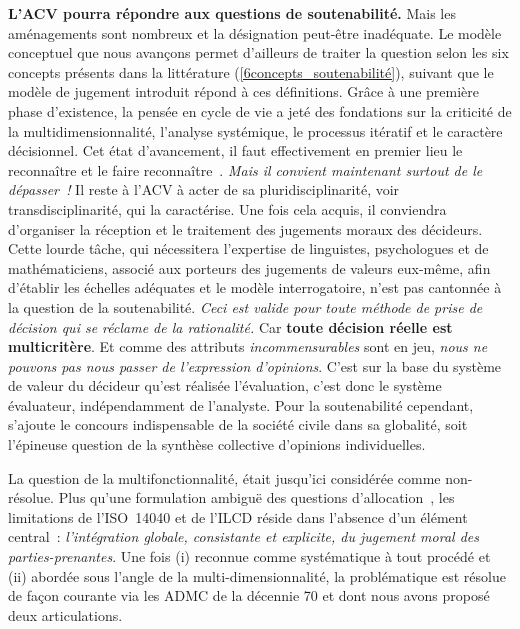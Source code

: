 \textbf{L'ACV pourra répondre aux questions de soutenabilité.}
Mais les aménagements sont nombreux et la désignation peut-être inadéquate.
Le modèle conceptuel que nous avançons permet d'ailleurs de traiter la question selon les six concepts présents dans la littérature (\ref{6concepts_soutenabilité}), suivant que le modèle de jugement introduit répond à ces définitions.
Grâce à une première phase d'existence, la pensée en cycle de vie a jeté des fondations sur la criticité de la multidimensionnalité, l'analyse systémique, le processus itératif et le caractère décisionnel.
Cet état d'avancement, il faut effectivement en premier lieu le reconnaître et le faire reconnaître~\cite[conclusion p.244]{klopffer_background_2014}.
\textit{Mais il convient maintenant surtout de le dépasser~!}
Il reste à l'ACV à acter de sa pluridisciplinarité, voir transdisciplinarité, qui la caractérise.
Une fois cela acquis, il conviendra d'organiser la réception et le traitement des jugements moraux des décideurs.
Cette lourde tâche, qui nécessitera l'expertise de linguistes, psychologues et de mathématiciens, associé aux porteurs des jugements de valeurs eux-même, afin d'établir les échelles adéquates et le modèle interrogatoire, n'est pas cantonnée à la question de la soutenabilité.
\emph{Ceci est valide pour toute méthode de prise de décision qui se réclame de la rationalité.}
Car \textbf{toute décision réelle est multicritère}.
Et comme des attributs \emph{incommensurables} sont en jeu, \emph{nous ne pouvons pas nous passer de l'expression d'opinions}.
C'est sur la base du système de valeur du décideur qu'est réalisée l'évaluation, c'est donc le système évaluateur, indépendamment de l'analyste.
Pour la soutenabilité cependant, s'ajoute le concours indispensable de la société civile dans sa globalité, soit l'épineuse question de la synthèse collective d'opinions individuelles.

La question de la multifonctionnalité, était jusqu'ici considérée comme non-résolue.
Plus qu'une formulation ambiguë des questions d'allocation~\cite{weidema_has_2014},
les limitations de l'ISO~14040 et de l'ILCD réside dans l'absence d'un élément central~: \emph{l'intégration globale, consistante et explicite, du jugement moral des parties-prenantes}.
Une fois (i) reconnue comme systématique à tout procédé et (ii) abordée sous l'angle de la multi-dimensionnalité, la problématique est résolue de façon courante via les \gls{ADMC} de la décennie 70 et dont nous avons proposé deux articulations. %

